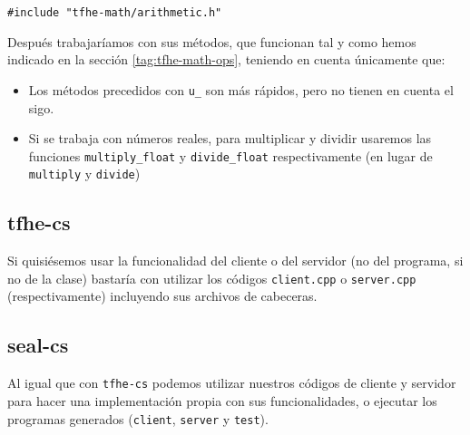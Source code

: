 \begin{verbatim}
#include "tfhe-math/arithmetic.h"
\end{verbatim}

Después trabajaríamos con sus métodos, que funcionan tal y como hemos indicado en la sección \ref{tag:tfhe-math-ops}, teniendo en cuenta únicamente que:

\begin{itemize}
    \item Los métodos precedidos con \verb|u_| son más rápidos, pero no tienen en cuenta el sigo.
    \item Si se trabaja con números reales, para multiplicar y dividir usaremos las funciones \verb|multiply_float| y \verb|divide_float| respectivamente (en lugar de \verb|multiply| y \verb|divide|)
\end{itemize}

\subsection{tfhe-cs}

Si quisiésemos usar la funcionalidad del cliente o del servidor (no del programa, si no de la clase) bastaría con utilizar los códigos \verb|client.cpp| o \verb|server.cpp| (respectivamente) incluyendo sus archivos de cabeceras.

\subsection{seal-cs}

Al igual que con \verb|tfhe-cs| podemos utilizar nuestros códigos de cliente y servidor para hacer una implementación propia con sus funcionalidades, o ejecutar los programas generados (\verb|client|, \verb|server| y \verb|test|).